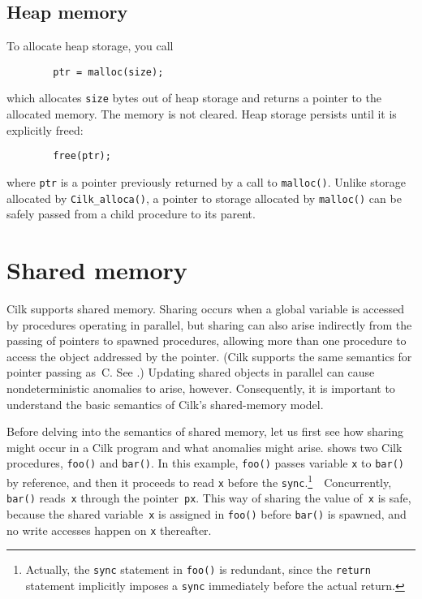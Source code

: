 \subsection{Heap memory}

To allocate heap storage, you call
\begin{verbatim}
        ptr = malloc(size);
\end{verbatim}
which allocates \texttt{size} bytes out of heap storage and returns a
pointer to the allocated memory.  The memory is not cleared.  Heap
storage persists until it is explicitly freed:
\begin{verbatim}
        free(ptr);
\end{verbatim}
where \texttt{ptr} is a pointer previously returned by a call to
\texttt{malloc()}. Unlike storage allocated by
\texttt{Cilk\_alloca()}, a pointer to storage allocated by
\texttt{malloc()} can be safely passed from a child procedure to
its parent.
\indexalloc{|)}


\section{Shared memory}
\label{sec:shared}

Cilk supports shared memory.  Sharing occurs when a global variable is
accessed by procedures operating in parallel, but sharing can also
arise indirectly from the passing of pointers to spawned procedures,
allowing more than one procedure to access the object addressed by the
pointer.  (Cilk supports the same semantics for pointer passing
as~C\@.  See .)  Updating shared objects in parallel
can cause nondeterministic anomalies to arise, however.  Consequently,
it is important to understand the basic semantics of Cilk's
shared-memory model.

Before delving into the semantics of shared memory, let us first see
how sharing might occur in a Cilk program and what anomalies might
arise.   shows two Cilk procedures,
\texttt{foo()} and \texttt{bar()}.  In this example, \texttt{foo()}
passes variable \texttt{x} to \texttt{bar()} by reference, and then it
proceeds to read \texttt{x} before the
\texttt{sync}.\footnote{Actually, the \texttt{sync} statement in
\texttt{foo()} is redundant, since the \texttt{return} statement
implicitly imposes a \texttt{sync} immediately before the actual
return.}\ \ Concurrently, \texttt{bar()} reads~\texttt{x} through the
pointer~\texttt{px}.  This way of sharing the value of~\texttt{x} is
safe, because the shared variable~\texttt{x} is assigned in
\texttt{foo()} before \texttt{bar()} is spawned, and no write accesses
happen on \texttt{x} thereafter.

